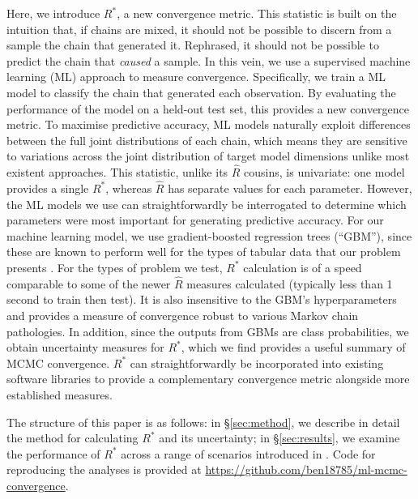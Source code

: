 \documentclass{article}
\begin{document}
Here, we introduce $R^*$, a new convergence metric. This statistic is built on the intuition that, if chains are mixed, it should not be possible to discern from a sample the chain that generated it. Rephrased, it should not be possible to predict the chain that \textit{caused} a sample. In this vein, we use a supervised machine learning (ML) approach to measure convergence. Specifically, we train a ML model to classify the chain that generated each observation. By evaluating the performance of the model on a held-out test set, this provides a new convergence metric. To maximise predictive accuracy, ML models naturally exploit differences between the full joint distributions of each chain, which means they are sensitive to variations across the joint distribution of target model dimensions unlike most existent approaches. This statistic, unlike its $\hat{R}$ cousins, is univariate: one model provides a single $R^*$, whereas $\hat{R}$ has separate values for each parameter. However, the ML models we use can straightforwardly be interrogated to determine which parameters were most important for generating predictive accuracy. For our machine learning model, we use gradient-boosted regression trees \cite{friedman2001greedy,greenwell2019package} (``GBM''), since these are known to perform well for the types of tabular data that our problem presents \cite{chollet2018}. For the types of problem we test, $R^*$ calculation is of a speed comparable to some of the newer $\hat{R}$ measures calculated (typically less than 1 second to train then test). It is also insensitive to the GBM's hyperparameters and provides a measure of convergence robust to various Markov chain pathologies. In addition, since the outputs from GBMs are class probabilities, we obtain uncertainty measures for $R^*$, which we find provides a useful summary of MCMC convergence. $R^*$ can straightforwardly be incorporated into existing software libraries to provide a complementary convergence metric alongside more established measures.

The structure of this paper is as follows: in \S\ref{sec:method}, we describe in detail the method for calculating $R^*$ and its uncertainty; in \S\ref{sec:results}, we examine the performance of $R^*$ across a range of scenarios introduced in \cite{vehtari2019rank}. Code for reproducing the analyses is provided at \url{https://github.com/ben18785/ml-mcmc-convergence}.

\end{document}
